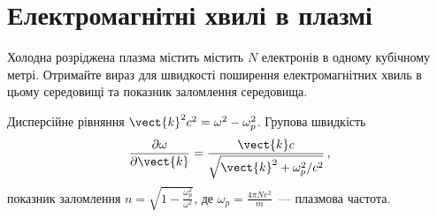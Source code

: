 




\section{Електромагнітні хвилі в плазмі}






\begin{problem}
Холодна розріджена плазма містить містить $N$ електронів в одному кубічному метрі. Отримайте вираз для
швидкості поширення електромагнітних хвиль в цьому середовищі та показник заломлення середовища.
\begin{solution}
Дисперсійне рівняння $ \vect{k}^2c^2=\omega^2-\omega_p^2$. Групова швидкість
\begin{equation*}
    \frac{\partial \omega}{\partial \vect{k}}=\frac{\vect{k} c}{\sqrt{\vect{k}^2+\omega_p^2/c^2}}\,,
\end{equation*}
показник заломлення
	$n = \sqrt{1 - \frac{\omega_p^2}{\omega^2}}$, де $\omega_p = \frac{4\pi N e^2}{m}$~--- плазмова
	частота.
\end{solution}
\end{problem}

